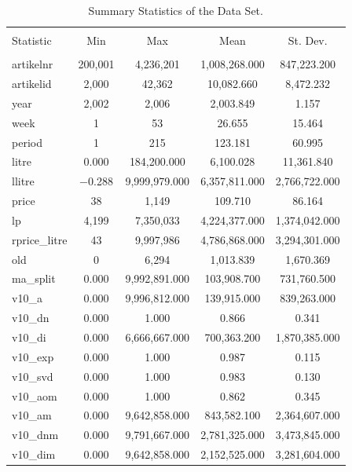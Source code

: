 \documentclass[11pt,]{article}
\begin{document}

\begin{table}[!htbp] \centering
  \caption{Summary Statistics of the Data Set.}
  \label{tab:SumStat}
\begin{tabular}{@{\extracolsep{5pt}}lcccc}
\\[-1.8ex]\hline
\hline \\[-1.8ex]
Statistic & \multicolumn{1}{c}{Min} & \multicolumn{1}{c}{Max} & \multicolumn{1}{c}{Mean} & \multicolumn{1}{c}{St. Dev.} \\
\hline \\[-1.8ex]
artikelnr & 200,001 & 4,236,201 & 1,008,268.000 & 847,223.200 \\
artikelid & 2,000 & 42,362 & 10,082.660 & 8,472.232 \\
year & 2,002 & 2,006 & 2,003.849 & 1.157 \\
week & 1 & 53 & 26.655 & 15.464 \\
period & 1 & 215 & 123.181 & 60.995 \\
litre & 0.000 & 184,200.000 & 6,100.028 & 11,361.840 \\
llitre & $-$0.288 & 9,999,979.000 & 6,357,811.000 & 2,766,722.000 \\
price & 38 & 1,149 & 109.710 & 86.164 \\
lp & 4,199 & 7,350,033 & 4,224,377.000 & 1,374,042.000 \\
rprice\_litre & 43 & 9,997,986 & 4,786,868.000 & 3,294,301.000 \\
old & 0 & 6,294 & 1,013.839 & 1,670.369 \\
ma\_split & 0.000 & 9,992,891.000 & 103,908.700 & 731,760.500 \\
v10\_a & 0.000 & 9,996,812.000 & 139,915.000 & 839,263.000 \\
v10\_dn & 0.000 & 1.000 & 0.866 & 0.341 \\
v10\_di & 0.000 & 6,666,667.000 & 700,363.200 & 1,870,385.000 \\
v10\_exp & 0.000 & 1.000 & 0.987 & 0.115 \\
v10\_svd & 0.000 & 1.000 & 0.983 & 0.130 \\
v10\_aom & 0.000 & 1.000 & 0.862 & 0.345 \\
v10\_am & 0.000 & 9,642,858.000 & 843,582.100 & 2,364,607.000 \\
v10\_dnm & 0.000 & 9,791,667.000 & 2,781,325.000 & 3,473,845.000 \\
v10\_dim & 0.000 & 9,642,858.000 & 2,152,525.000 & 3,281,604.000 \\

\end{tabular}
\end{table}
\end{document}
